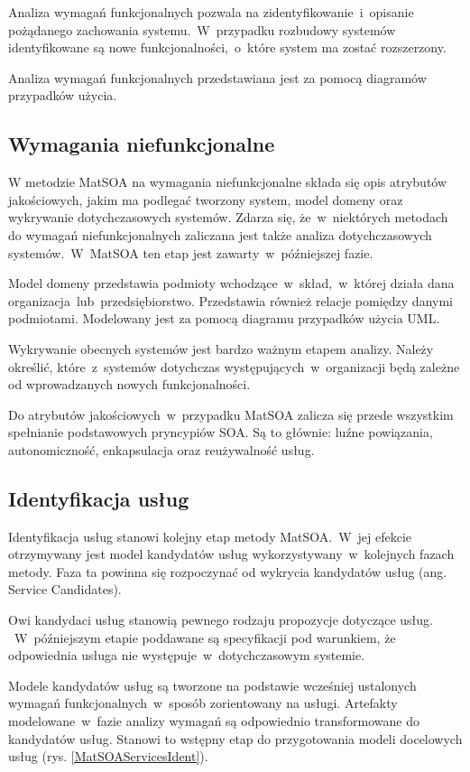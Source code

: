Analiza wymagań funkcjonalnych pozwala na zidentyfikowanie~i~opisanie pożądanego zachowania systemu.~W~przypadku rozbudowy systemów identyfikowane są nowe funkcjonalności,~o~które system ma zostać rozszerzony.

Analiza wymagań funkcjonalnych przedstawiana jest za pomocą diagramów przypadków użycia.

\subsection*{Wymagania niefunkcjonalne}
W metodzie MatSOA na wymagania niefunkcjonalne składa się opis atrybutów jakościowych, jakim ma podlegać tworzony system, model domeny oraz wykrywanie dotychczasowych systemów. Zdarza się, że~w~niektórych metodach do wymagań niefunkcjonalnych zaliczana jest także analiza dotychczasowych systemów.~W~MatSOA ten etap jest zawarty~w~późniejszej fazie. 

Model domeny przedstawia podmioty wchodzące~w~skład,~w~której działa dana organizacja~lub~przedsiębiorstwo. Przedstawia również relacje pomiędzy danymi podmiotami. Modelowany jest za pomocą diagramu przypadków użycia UML.

Wykrywanie obecnych systemów jest bardzo ważnym etapem analizy. Należy określić, które~z~systemów dotychczas występujących~w~organizacji będą zależne od wprowadzanych nowych funkcjonalności.

Do atrybutów jakościowych~w~przypadku MatSOA zalicza się przede wszystkim spełnianie podstawowych pryncypiów SOA. Są to głównie: luźne powiązania, autonomiczność, enkapsulacja oraz reużywalność usług.

\subsection{Identyfikacja usług}
Identyfikacja usług stanowi kolejny etap metody MatSOA.~W~jej efekcie otrzymywany jest model kandydatów usług wykorzystywany~w~kolejnych fazach metody. 
Faza ta powinna się rozpoczynać od wykrycia kandydatów usług (ang. Service Candidates). 

Owi kandydaci usług stanowią pewnego rodzaju propozycje dotyczące usług. ~W~późniejszym etapie poddawane są specyfikacji pod warunkiem, że odpowiednia usługa nie występuje~w~dotychczasowym systemie.

Modele kandydatów usług są tworzone na podstawie wcześniej ustalonych wymagań funkcjonalnych~w~sposób zorientowany na usługi. Artefakty modelowane~w~fazie analizy wymagań są odpowiednio transformowane do kandydatów usług. Stanowi to wstępny etap do przygotowania modeli docelowych usług (rys. \ref{MatSOAServicesIdent}). 

